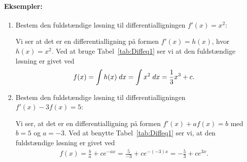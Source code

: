 \paragraph*{Eksempler:}
\begin{enumerate}
\item Bestem den fuldstændige løsning til differentialligningen $f'(x)=x^2$:

Vi ser at det er en differentialligning på formen $f'(x)=h(x)$, hvor $h(x)=x^2$. Ved at bruge Tabel~\ref{tab:Diffeq1} ser vi at den fuldstændige løsning er givet ved
\begin{align*}
f(x) = \int h(x) \; d x = \int x^2 \; d x = \frac{1}{3}x^3+c.
\end{align*}

\item Bestem den fuldstændige løsning til differentialligningen $f'(x)-3f(x)=5$:

Vi ser, at det er en differentialligning på formen $f'(x)+af(x)=b$ med $b=5$ og $a=-3$. Ved at benytte Tabel~\ref{tab:Diffeq1} ser vi, at den fuldstændige løsning er givet ved
\begin{align*}
f(x)=\frac{b}{a}+ce^{-ax} = \frac{5}{-3} +ce^{- (-3)x} = -\frac{5}{3}+ce^{3x}.
\end{align*}
\end{enumerate}
